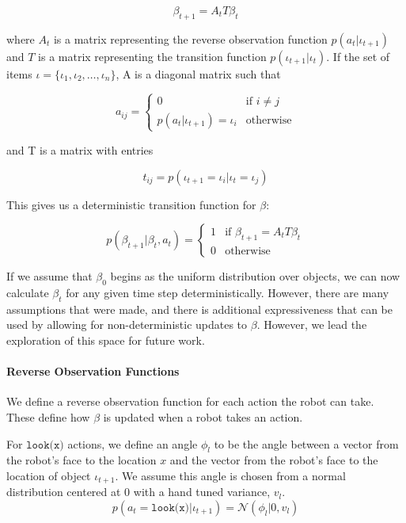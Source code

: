 \documentclass[conference]{IEEEtran}
\begin{document}
$$\beta_{t+1} = A_{t}T \beta_{t}$$


where $A_{t}$ is a matrix representing the reverse observation function $p(a_{t} | \iota_{t+1})$ and $T$ is a matrix representing the transition function $p(\iota_{t+1}|\iota_{t})$.  If the set of items $\mathcal{\iota} = \{ \iota_1, \iota_2, \ldots, \iota_n\}$, A is a diagonal matrix such that

\begin{equation*}
	a_{ij} = \begin{cases}
		0 & \text{if } i \ne j \\
		p(a_t | \iota_{t+1}) = \iota_i & \text{otherwise}
	\end{cases}
\end{equation*}

and T is a matrix with entries

\begin{equation*}
	t_{ij} = p(\iota_{t+1} = \iota_i | \iota_{t} = \iota_j)
\end{equation*}
		


This gives us a deterministic transition function for $\beta$: 

\begin{equation}
	p(\beta_{t+1} | \beta_t, a_t) = \begin{cases}
		1 & \text{if } \beta_{t+1} = A_t T \beta_t \\
		0 & \text{otherwise}
	\end{cases}
\end{equation}

If we assume that $\beta_0$ begins as the uniform distribution over objects, we can now calculate $\beta_t$ for any given time step deterministically. However, there are many assumptions that were made, and there is additional expressiveness that can be used by allowing for non-deterministic updates to $\beta$. However, we lead the exploration of this space for future work. 

\paragraph{Reverse Observation Functions} \label{reverse}

We define a reverse observation function for each action the robot can take. These define how $\beta$ is updated when a robot takes an action. 

For $\texttt{look(x)}$ actions, we define an angle $\phi_l$ to be the angle between a vector from the robot's face to the location $x$ and the vector from the robot's face to the location of object $\iota_{t+1}$. We assume this angle is chosen from a normal distribution centered at 0 with a hand tuned variance, $v_l$. 
$$p(a_{t} = \texttt{look(x)} | \iota_{t+1}) = \mathcal{N}(\phi_l | 0, v_{l})$$
\end{document}

